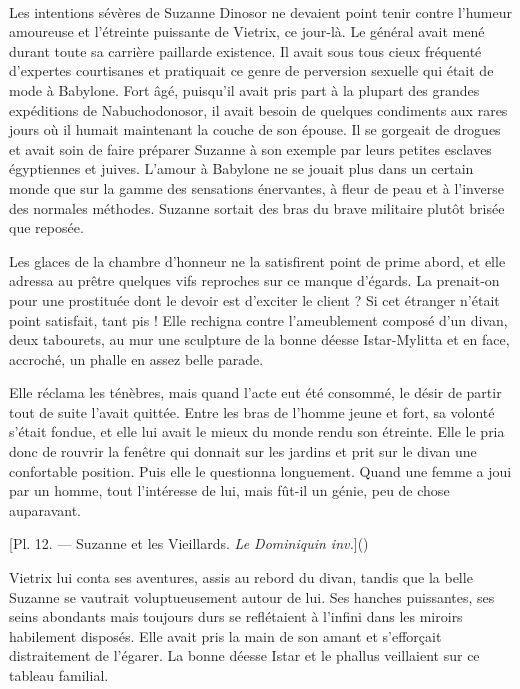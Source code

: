 \documentclass[a4paper, 11pt, oneside, polutonikogreek, french]{article}
\begin{document}
\paragraph{}
Les intentions sévères de Suzanne Dinosor ne devaient point tenir contre l'humeur amoureuse et l'étreinte puissante de Vietrix, ce jour-là. Le général avait mené durant toute sa carrière paillarde existence. Il avait sous tous cieux fréquenté d'expertes courtisanes et pratiquait ce genre de perversion sexuelle qui était de mode à Babylone. Fort âgé, puisqu'il avait pris part à la plupart des grandes expéditions de Nabuchodonosor, il avait besoin de quelques condiments aux rares jours où il humait maintenant la couche de son épouse. Il se gorgeait de drogues et avait soin de faire préparer Suzanne à son exemple par leurs petites esclaves égyptiennes et juives. L'amour à Babylone ne se jouait plus dans un certain monde que sur la gamme des sensations énervantes, à fleur de peau et à l'inverse des normales méthodes. Suzanne sortait des bras du brave militaire plutôt brisée que reposée.

\bigskip
\centerline{\EightStarTaper}
\centerline{\EightStarTaper\EightStarTaper}
\bigskip

Les glaces de la chambre d'honneur ne la satisfirent point de prime abord, et elle adressa au prêtre quelques vifs reproches sur ce manque d'égards. La prenait-on pour une prostituée dont le devoir est d'exciter le client ? Si cet étranger n'était point satisfait, tant pis ! Elle rechigna contre l'ameublement composé d'un divan, deux tabourets, au mur une sculpture de la bonne déesse Istar-Mylitta et en face, accroché, un phalle en assez belle parade.

Elle réclama les ténèbres, mais quand l'acte eut été consommé, le désir de partir tout de suite l'avait quittée. Entre les bras de l'homme jeune et fort, sa volonté s'était fondue, et elle lui avait le mieux du monde rendu son étreinte. Elle le pria donc de rouvrir la fenêtre qui donnait sur les jardins et prit sur le divan une confortable position. Puis elle le questionna longuement. Quand une femme a joui par un homme, tout l'intéresse de lui, mais fût-il un génie, peu de chose auparavant.

[Pl. 12. --- Suzanne et les Vieillards. \emph{Le Dominiquin inv.}]()

Vietrix lui conta ses aventures, assis au rebord du divan, tandis que la belle Suzanne se vautrait voluptueusement autour de lui. Ses hanches puissantes, ses seins abondants mais toujours durs se reflétaient à l'infini dans les miroirs habilement disposés. Elle avait pris la main de son amant et s'efforçait distraitement de l'égarer. La bonne déesse Istar et le phallus veillaient sur ce tableau familial.
\end{document}
